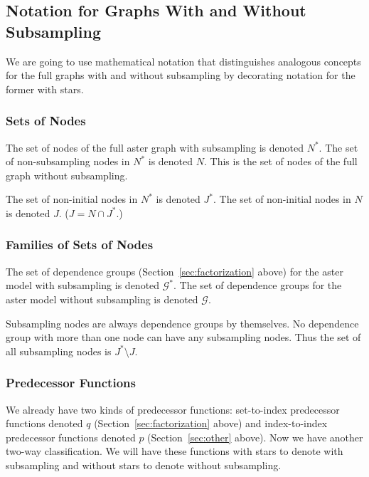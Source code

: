
\subsection{Notation for Graphs With and Without Subsampling}
\label{sec:with-and-without-notation}

We are going to use mathematical notation that distinguishes analogous
concepts for the full graphs with and without subsampling by decorating
notation for the former with stars.

\subsubsection{Sets of Nodes}

The set of nodes of the full aster graph with subsampling is denoted $N^*$.
The set of non-subsampling nodes in $N^*$ is denoted $N$.  This is the set
of nodes of the full graph without subsampling.

The set of non-initial nodes in $N^*$ is denoted $J^*$.
The set of non-initial nodes in $N$ is denoted $J$.
($J = N \cap J^*$.)

\subsubsection{Families of Sets of Nodes}

The set of dependence groups
(Section~\ref{sec:factorization} above)
for the aster model with subsampling is denoted $\mathcal{G}^*$.
The set of dependence groups
for the aster model without subsampling is denoted $\mathcal{G}$.

Subsampling nodes are always dependence groups by themselves.
No dependence group with more than one node can have any subsampling nodes.
Thus the set of all subsampling nodes is $J^* \setminus J$.

\subsubsection{Predecessor Functions}

We already have two kinds of predecessor functions:
set-to-index predecessor functions denoted $q$
(Section~\ref{sec:factorization} above) and
index-to-index predecessor functions denoted $p$
(Section~\ref{sec:other} above).
Now we have another two-way classification.
We will have these functions with stars to denote with subsampling
and without stars to denote without subsampling.

